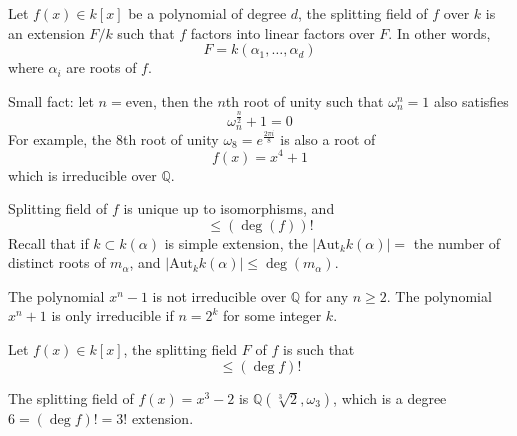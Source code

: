 \documentclass[openany]{book}
\newcommand{\Q}{\mathbb{Q}}
\newcommand{\aut}{\text{Aut}}
\newcommand{\om}{\omega}
\begin{document}
\begin{defn}
    Let $f(x)\in k[x]$ be a polynomial of degree $d$, the splitting field of $f$ over $k$ is an extension $F/k$ such that $f$ factors into linear factors over $F$. In other words, 
    \begin{equation*}
        F=k(\alpha_1,\dots, \alpha_d)
    \end{equation*}
    where $\alpha_i$ are roots of $f$.
\end{defn}



\begin{prop}
    Small fact: let $n=$even, then the $n$th root of unity such that $\om_n^n=1$ also satisfies 
    \begin{equation*}
        \om_n^\frac{n}{2}+1=0
    \end{equation*}
    For example, the $8$th root of unity $\om_8=e^{\frac{2\pi i}{8}}$ is also a root of 
    \begin{equation*}
        f(x)=x^4+1
    \end{equation*}
    which is irreducible over $\Q$.
\end{prop}

\begin{prop}
    Splitting field of $f$ is unique up to isomorphisms, and 
    \begin{equation*}
        [F:k]\leq(\deg(f))!
    \end{equation*}
    Recall that if $k\subset k(\alpha)$ is simple extension, the $|\aut_kk(\alpha)|=$ the number of distinct roots of $m_\alpha$, and $|\aut_kk(\alpha)|\leq\deg(m_\alpha)$.
\end{prop}

\begin{prop}
    The polynomial $x^n-1$ is not irreducible over $\Q$ for any $n\geq 2$. The polynomial $x^n+1$ is only irreducible if $n=2^k$ for some integer $k$.
\end{prop}


\begin{prop}
    Let $f(x)\in k[x]$, the splitting field $F$ of $f$ is such that 
    \begin{equation*}
        [F:k]\leq (\deg f)!
    \end{equation*}
\end{prop}
\begin{example}
    The splitting field of $f(x)=x^3-2$ is $\Q(\sqrt[3]{2}, \om_3)$, which is a degree $6=(\deg f)!=3!$ extension. 
\end{example}
\end{document}
